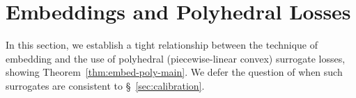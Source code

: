 \documentclass[11pt]{article}
\newcommand{\Comments}{1}
\newcommand{\mynote}[2]{\ifnum\Comments=1\textcolor{#1}{#2}\fi}
\newcommand{\raf}[1]{\mynote{darkgreen}{[RF: #1]}}
\newcommand{\simplex}{\Delta_\Y}
\newcommand{\Y}{\mathcal{Y}}
\newcommand{\ellzo}{\ell_{\text{0-1}}}
\DeclareMathOperator*{\argmax}{arg\,max}
\begin{document}










\section{Embeddings and Polyhedral Losses}
\label{sec:poly-loss-embed}

In this section, we establish a tight relationship between the technique of embedding and the use of polyhedral (piecewise-linear convex) surrogate losses, showing Theorem~\ref{thm:embed-poly-main}.
We defer the question of when such surrogates are consistent to \S~\ref{sec:calibration}. 
\end{document}
